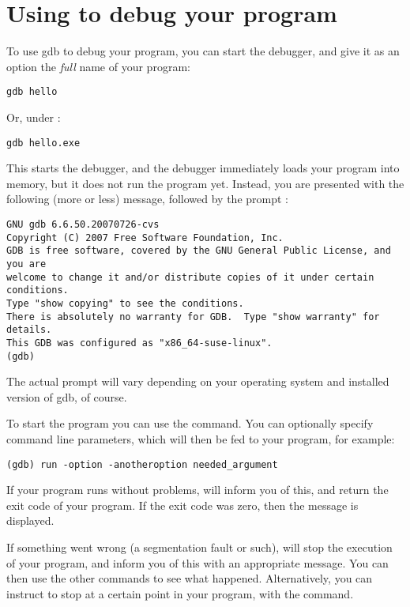 \section{Using  to debug your program}
\label{se:usinggdb}

To use gdb to debug your program, you can start the debugger, and give it as
an option the {\em full} name of your program:
\begin{verbatim}
gdb hello
\end{verbatim}
Or, under \dos :
\begin{verbatim}
gdb hello.exe
\end{verbatim}

This starts the debugger, and the debugger immediately loads your program
into memory, but it does not run the program yet. Instead, you are presented
with the following (more or less) message, followed by the  prompt
:
\begin{verbatim}
GNU gdb 6.6.50.20070726-cvs
Copyright (C) 2007 Free Software Foundation, Inc.
GDB is free software, covered by the GNU General Public License, and you are
welcome to change it and/or distribute copies of it under certain conditions.
Type "show copying" to see the conditions.
There is absolutely no warranty for GDB.  Type "show warranty" for details.
This GDB was configured as "x86_64-suse-linux".
(gdb)
\end{verbatim}
The actual prompt will vary depending on  your operating system and
installed version of gdb, of course.

To start the program you can use the  command. You can optionally
specify command line parameters, which will then be fed to your program, for
example:
\begin{verbatim}
(gdb) run -option -anotheroption needed_argument
\end{verbatim}
If your program runs without problems,  will inform you of this,
and return the exit code of your program. If the exit code was zero, then
the message  is displayed.

If something went wrong (a segmentation fault or such),  will stop
the execution of your program, and inform you of this with an appropriate
message. You can then use the other  commands to see what happened.
Alternatively, you can instruct  to stop at a certain point in your
program, with the  command.


